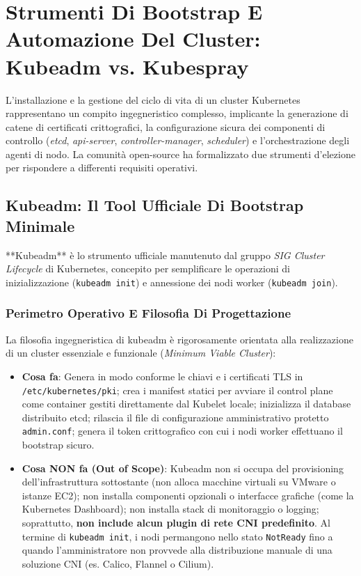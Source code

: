 \documentclass[11pt, a4paper]{article}
\begin{document}
\newpage

\section{Strumenti Di Bootstrap E Automazione Del Cluster: Kubeadm vs. Kubespray}

L'installazione e la gestione del ciclo di vita di un cluster Kubernetes rappresentano un compito ingegneristico complesso, implicante la generazione di catene di certificati crittografici, la configurazione sicura dei componenti di controllo (\emph{etcd}, \emph{api-server}, \emph{controller-manager}, \emph{scheduler}) e l'orchestrazione degli agenti di nodo. La comunità open-source ha formalizzato due strumenti d'elezione per rispondere a differenti requisiti operativi.


\subsection{Kubeadm: Il Tool Ufficiale Di Bootstrap Minimale}
**Kubeadm** è lo strumento ufficiale manutenuto dal gruppo \emph{SIG Cluster Lifecycle} di Kubernetes, concepito per semplificare le operazioni di inizializzazione (\texttt{kubeadm init}) e annessione dei nodi worker (\texttt{kubeadm join}).

\subsubsection{Perimetro Operativo E Filosofia Di Progettazione}
La filosofia ingegneristica di kubeadm è rigorosamente orientata alla realizzazione di un cluster essenziale e funzionale (\emph{Minimum Viable Cluster}):
\begin{itemize}[noitemsep]
    \item \textbf{Cosa fa}: Genera in modo conforme le chiavi e i certificati TLS in \texttt{/etc/kubernetes/pki}; crea i manifest statici per avviare il control plane come container gestiti direttamente dal Kubelet locale; inizializza il database distribuito etcd; rilascia il file di configurazione amministrativo protetto \texttt{admin.conf}; genera il token crittografico con cui i nodi worker effettuano il bootstrap sicuro.
    \item \textbf{Cosa NON fa (Out of Scope)}: Kubeadm non si occupa del provisioning dell'infrastruttura sottostante (non alloca macchine virtuali su VMware o istanze EC2); non installa componenti opzionali o interfacce grafiche (come la Kubernetes Dashboard); non installa stack di monitoraggio o logging; soprattutto, \textbf{non include alcun plugin di rete CNI predefinito}. Al termine di \texttt{kubeadm init}, i nodi permangono nello stato \texttt{NotReady} fino a quando l'amministratore non provvede alla distribuzione manuale di una soluzione CNI (es. Calico, Flannel o Cilium).
\end{itemize}
\end{document}
